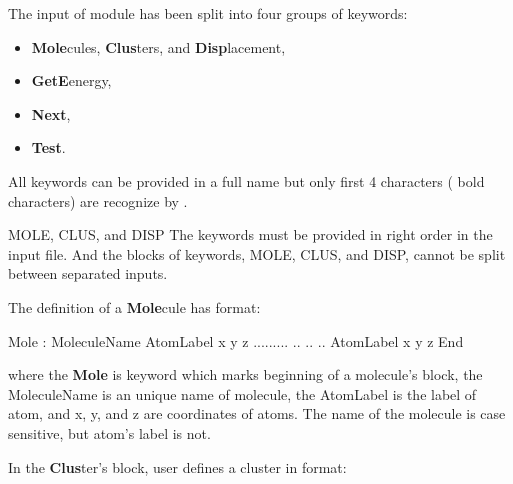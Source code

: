 The input of  module has been split into four groups of keywords:
\begin{itemize}
\item {\bf Mole}cules, {\bf Clus}ters, and {\bf Disp}lacement,
\item {\bf GetE}energy,
\item {\bf Next},
\item {\bf Test}.
\end{itemize}
All keywords can be provided in a full name but only first 4 characters ( bold characters) are recognize by .


\begin{keywordlist}
\item[MOLE, CLUS, and DISP]
The keywords must be provided in right order in the input file. And the blocks of keywords, MOLE, CLUS, and DISP, cannot be split between separated  inputs.

The definition of a {\bf Mole}cule has format:\\

\begin{sourcelisting}
   Mole : MoleculeName
     AtomLabel  x  y  z
     .........  .. .. ..
     AtomLabel  x  y  z
   End
\end{sourcelisting}
where the {\bf Mole} is keyword which marks beginning of a molecule's block, the MoleculeName is an unique name of molecule, the AtomLabel is the label of atom, and x, y, and z are coordinates of atoms. The name of the molecule is case sensitive, but atom's label is not.



In the {\bf Clus}ter's block, user defines a cluster in format:\\


\end{keywordlist}
